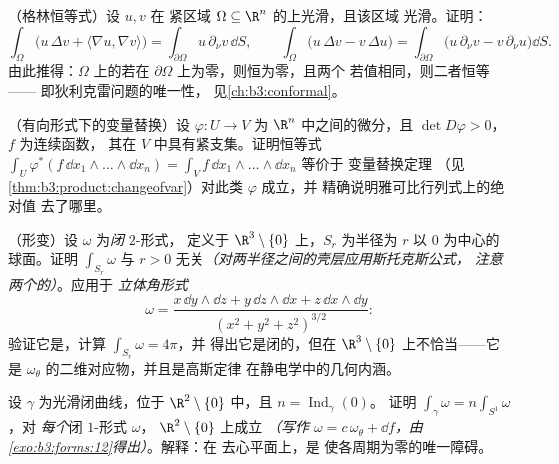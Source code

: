 \begin{exercise}[$\star\star$]\label{exo:b3:forms:8}
（格林恒等式）设 $u, v$ 在
紧区域 $\Omega \subseteq \R^n$ 的上光滑，且该区域
光滑。证明：
\[
\int_\Omega\bigl(u\,\Delta v + \langle\nabla u, \nabla
v\rangle\bigr) = \int_{\partial\Omega}u\,\partial_\nu
v\,\dd S,
\qquad
\int_\Omega\bigl(u\,\Delta v - v\,\Delta u\bigr) =
\int_{\partial\Omega}\bigl(u\,\partial_\nu v -
v\,\partial_\nu u\bigr)\dd S .
\]
由此推得：$\Omega$ 上的若在
$\partial\Omega$ 上为零，则恒为零，且两个
若值相同，则二者恒等——
即狄利克雷问题的唯一性，
见\cref{ch:b3:conformal}。
\end{exercise}

\begin{exercise}[$\star\star$]\label{exo:b3:forms:9}
（有向形式下的变量替换）设 $\varphi\colon U
\to V$ 为 $\R^n$ 中之间的微分，且 $\det
D\varphi > 0$，$f$ 为连续函数，
其在 $V$ 中具有紧支集。证明恒等式
$\int_U\varphi^*(f\,\dd x_1\wedge\dots\wedge\dd x_n) =
\int_Vf\,\dd x_1\wedge\dots\wedge\dd x_n$ 等价于
变量替换定理
（见\cref{thm:b3:product:changeofvar}）对此类 $\varphi$ 成立，并
精确说明雅可比行列式上的绝对值
去了哪里。
\end{exercise}

\begin{exercise}[$\star\star\star$]\label{exo:b3:forms:10}
（形变）设 $\omega$ 为\emph{闭} $2$-形式，
定义于 $\R^3\setminus\{0\}$ 上，$S_r$ 为半径为 $r$
以 $0$ 为中心的球面。证明 $\int_{S_r}\omega$
与 $r > 0$ 无关\emph{（对两半径之间的壳层应用斯托克斯公式，
注意两个的）}。应用于
\emph{立体角形式}
\[
\omega = \frac{x\,\dd y\wedge\dd z + y\,\dd z\wedge\dd x +
z\,\dd x\wedge\dd y}{(x^2 + y^2 + z^2)^{3/2}} :
\]
验证它是，计算 $\int_{S_r}\omega = 4\pi$，并
得出它是闭的，但在
$\R^3\setminus\{0\}$ 上不恰当——它是
$\omega_\theta$ 的二维对应物，并且是高斯定律
在静电学中的几何内涵。
\end{exercise}

\begin{exercise}[$\star\star$]\label{exo:b3:forms:11}
设 $\gamma$ 为光滑闭曲线，位于
$\R^2\setminus\{0\}$ 中，且 $n = \operatorname{Ind}_\gamma(0)$。
证明 $\int_\gamma\omega = n\int_{S^1}\omega$，对
\emph{每个}闭 $1$-形式 $\omega$，
$\R^2\setminus\{0\}$ 上成立 \emph{（写作 $\omega = c\,\omega_\theta
+ \dd f$，由\cref{exo:b3:forms:12}得出）}。解释：在
去心平面上，是
使各周期为零的唯一障碍。
\end{exercise}

